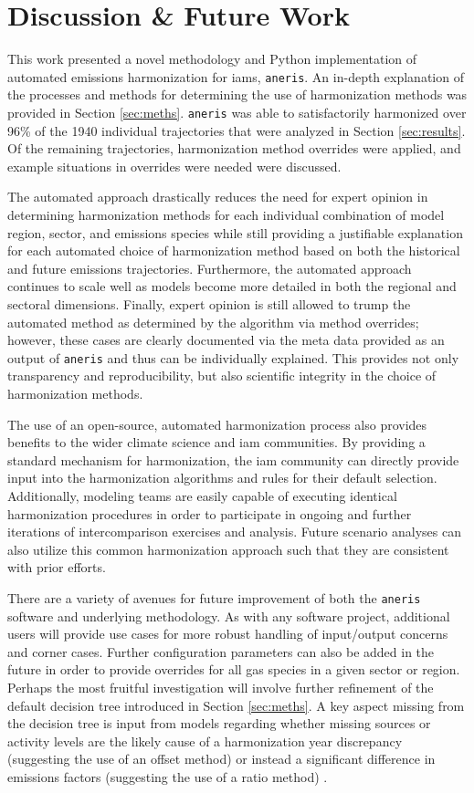 \documentclass[review]{elsarticle}
\newcommand{\code}[1]{\lstinline[basicstyle=\ttfamily\color{black}]|#1|}
\begin{document}
\section{Discussion \& Future Work}\label{sec:future}

This work presented a novel methodology and Python implementation of automated
emissions harmonization for \glspl{iam}, \code{aneris}. An in-depth explanation of the
processes and methods for determining the use of harmonization methods was
provided in Section \ref{sec:meths}. \code{aneris} was able to satisfactorily
harmonized over 96\% of the 1940 individual trajectories that were analyzed in
Section \ref{sec:results}. Of the remaining trajectories, harmonization method
overrides were applied, and example situations in overrides were needed were
discussed.

The automated approach drastically reduces the need for expert opinion in
determining harmonization methods for each individual combination of model
region, sector, and emissions species while still providing a justifiable
explanation for each automated choice of harmonization method based on both the
historical and future emissions trajectories. Furthermore, the automated
approach continues to scale well as models become more detailed in both the
regional and sectoral dimensions. Finally, expert opinion is still allowed to
trump the automated method as determined by the algorithm via method overrides;
however, these cases are clearly documented via the meta data provided as an
output of \code{aneris} and thus can be individually explained. This provides
not only transparency and reproducibility, but also scientific integrity in the
choice of harmonization methods.

The use of an open-source, automated harmonization process also provides
benefits to the wider climate science and \gls{iam} communities. By providing a
standard mechanism for harmonization, the \gls{iam} community can directly provide
input into the harmonization algorithms and rules for their default
selection. Additionally, modeling teams are easily capable of executing
identical harmonization procedures in order to participate in ongoing and
further iterations of intercomparison exercises and analysis. Future scenario
analyses can also utilize this common harmonization approach such that they are
consistent with prior efforts.

There are a variety of avenues for future improvement of both the \code{aneris}
software and underlying methodology. As with any software project, additional
users will provide use cases for more robust handling of input/output concerns
and corner cases. Further configuration parameters can also be added in the
future in order to provide overrides for all gas species in a given sector or
region. Perhaps the most fruitful investigation will involve further refinement
of the default decision tree introduced in Section \ref{sec:meths}. A key aspect
missing from the decision tree is input from models regarding whether missing
sources or activity levels are the likely cause of a harmonization year
discrepancy (suggesting the use of an offset method) or instead a significant
difference in emissions factors (suggesting the use of a ratio method)
\cite{rogelj_discrepancies_2011}.
\end{document}
